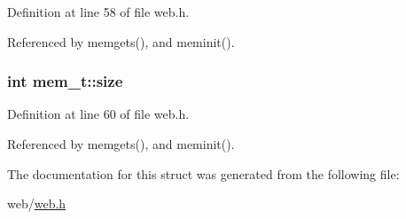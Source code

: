 Definition at line 58 of file web.\+h.



Referenced by memgets(), and meminit().

\subsubsection[{\texorpdfstring{size}{size}}]{\setlength{\rightskip}{0pt plus 5cm}int mem\+\_\+t\+::size}\hypertarget{structmem__t_ab04d46fb2982c9a26a26244286c1b33b}{}\label{structmem__t_ab04d46fb2982c9a26a26244286c1b33b}


Definition at line 60 of file web.\+h.



Referenced by memgets(), and meminit().



The documentation for this struct was generated from the following file\+:\begin{DoxyCompactItemize}
\item 
web/\hyperlink{web_8h}{web.\+h}\end{DoxyCompactItemize}
